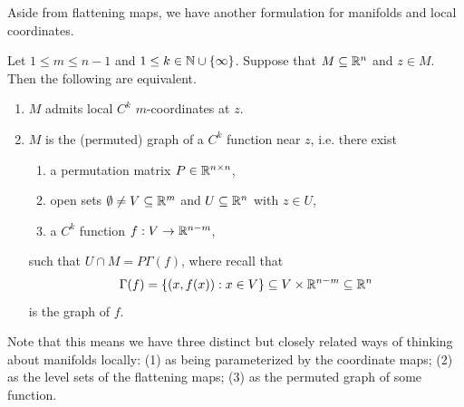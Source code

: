 \documentclass[a4paper]{article}
\begin{document}
Aside from flattening maps, we have another formulation 
for manifolds and local coordinates.
\begin{thm}
Let $1 \leq m \leq n-1$ and $1 \leq k \in \mathbb{N} \cup \{\infty\}$.
Suppose that $M \subseteq \mathbb{R}^n$ and $z \in M$. Then 
the following are equivalent.
\begin{enumerate}
\item $M$ admits local $C^k$ $m$-coordinates at $z$.
\item $M$ is the (permuted) graph of a $C^k$ function near
$z$, i.e. there exist
\begin{enumerate}
\item a permutation matrix $P \in \mathbb{R}^{n \times n}$,
\item open sets $\emptyset \neq V \subseteq \mathbb{R}^m$ and
$U \subseteq \mathbb{R}^n$ with $z \in U$,
\item a $C^k$ function $f : V \to \mathbb{R}^{n-m}$,
\end{enumerate}
such that $U \cap M = P \Gamma(f)$, where recall that
\begin{equation*}
\Gamma(f) = \{(x,f(x)) : x \in V\} \subseteq V \times
\mathbb{R}^{n-m} \subseteq \mathbb{R}^n
\end{equation*}
is the graph of $f$.
\end{enumerate}
\end{thm}

Note that this means we have three distinct but closely
related ways of thinking about manifolds locally:
(1) as being parameterized by the coordinate maps;
(2) as the level sets of the flattening maps;
(3) as the permuted graph of some function.
\end{document}
